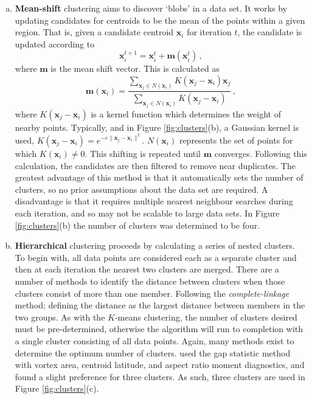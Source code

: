 \begin{enumerate}[(a)]
\item \textbf{Mean-shift} clustering aims to discover `blobs' in a data set. It
  works by updating candidates for centroids to be the mean of the points within
  a given region. That is, given a candidate centroid $\mathbf{x}_i$ for
  iteration $t$, the candidate is updated according to
  \begin{equation}
    \mathbf{x}^{t+1}_{i} = \mathbf{x}^t_i + \mathbf{m}(\mathbf{x}^t_i) \, ,
  \end{equation}
 where $\mathbf{m}$ is the mean shift vector. This is calculated as
 \begin{equation}
  \mathbf{m}(\mathbf{x}_i) = \frac{\sum_{\mathbf{x}_j \in N(\mathbf{x}_i)}K(\mathbf{x}_j-\mathbf{x}_i)\mathbf{x}_j}{\sum_{\mathbf{x}_j
      \in N(\mathbf{x}_i)}K(\mathbf{x}_j-\mathbf{x}_i)} \, ,
 \end{equation}
 where $K(\mathbf{x}_j-\mathbf{x}_i)$ is a kernel function which determines the
 weight of nearby points. Typically, and in Figure \ref{fig:clusters}(b), a
 Gaussian kernel is used,
 $K(\mathbf{x}_j-\mathbf{x}_i) = e^{-c\|\mathbf{x}_j-\mathbf{x}_i\|^2}$.
 $N(\mathbf{x}_i)$ represents the set of points for which
 $K(\mathbf{x}_i) \ne 0$. This shifting is repeated until $\mathbf{m}$
 converges. Following this calculation, the candidates are then filtered to
 remove near duplicates. The greatest advantage of this method is that it
 automatically sets the number of clusters, so no prior assumptions about the
 data set are required. A disadvantage is that it requires multiple nearest
 neighbour searches during each iteration, and so may not be scalable to large
 data sets. In Figure \ref{fig:clusters}(b) the number of clusters was
 determined to be four. 

\item \textbf{Hierarchical} clustering proceeds by calculating a series of
  nested clusters. To begin with, all data points are considered each as a
  separate cluster and then at each iteration the nearest two clusters are
  merged. There are a number of methods to identify the distance between
  clusters when those clusters consist of more than one member. Following
  \citet{Hannachi2010} the \emph{complete-linkage} method; defining the distance
  as the largest distance between members in the two groups. As with the
  $K$-means clustering, the number of clusters desired must be pre-determined,
  otherwise the algorithm will run to completion with a single cluster
  consisting of all data points. Again, many methods exist to determine the
  optimum number of clusters. \citet{Hannachi2010} used the gap statistic method
  \citep{Tibshirani2001} with vortex area, centroid latitude, and aspect ratio
  moment diagnostics, and found a slight preference for three clusters. As such,
  three clusters are used in Figure \ref{fig:clusters}(c).

\end{enumerate}

